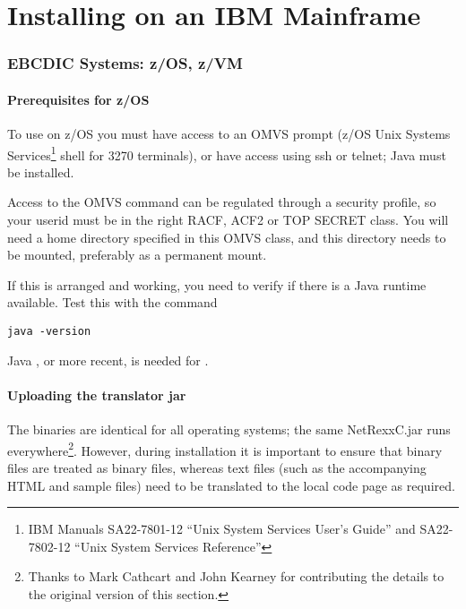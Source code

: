 \chapter{Installing on an IBM Mainframe}
\subsection{EBCDIC Systems: z/OS, z/VM}

\subsubsection{Prerequisites for z/OS}
To use \nr{} on z/OS you must have access to an OMVS
prompt (z/OS Unix Systems Services\footnote{IBM Manuals SA22-7801-12 ``Unix System
  Services User's Guide''
  and  SA22-7802-12 ``Unix System Services Reference''}  shell for
3270 terminals), or have access using ssh or telnet; Java must be
installed.

Access to the OMVS command can be regulated through a security profile, so your userid
must be in the right RACF, ACF2 or TOP SECRET class. You will need a home
directory specified in this OMVS class, and this directory needs to be
mounted, preferably as a permanent mount.

If this is arranged and working, you need to verify if there is a Java
runtime available. Test this with the command 
\begin{verbatim}
java -version
\end{verbatim}
Java \minimalJVMversion{}, or more recent, is needed for \nr{}.

\subsubsection{Uploading the \nr{} translator jar}

The \nr{} binaries are identical for all operating systems; the same
NetRexxC.jar runs everywhere\footnote{Thanks to Mark Cathcart
  and John Kearney for contributing the details to the original version of this section.}.
However, during installation it is important to ensure that binary files
are treated as binary files, whereas text files (such as the
accompanying HTML and sample files) need to be translated to the local code
page as required. 

